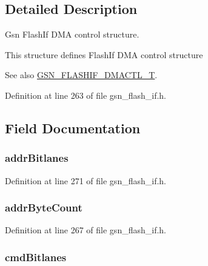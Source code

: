 \subsection{Detailed Description}
Gsn FlashIf DMA control structure. 

This structure defines FlashIf DMA control structure

\begin{DoxySeeAlso}{See also}
\hyperlink{a00647_ga3191e2eabef0c8e1b95922431d75565f}{GSN\_\-FLASHIF\_\-DMACTL\_\-T}. 
\end{DoxySeeAlso}


Definition at line 263 of file gsn\_\-flash\_\-if.h.



\subsection{Field Documentation}
\hypertarget{a00080_ac20b4d704a60073489c4a1369c753f88}{
\subsubsection[{addrBitlanes}]{ {\bf addrBitlanes}}}
\label{a00080_ac20b4d704a60073489c4a1369c753f88}


Definition at line 271 of file gsn\_\-flash\_\-if.h.

\hypertarget{a00080_a65a1735cd77a36302c9cadfa1b1a2f17}{
\subsubsection[{addrByteCount}]{ {\bf addrByteCount}}}
\label{a00080_a65a1735cd77a36302c9cadfa1b1a2f17}


Definition at line 267 of file gsn\_\-flash\_\-if.h.

\hypertarget{a00080_a56e303db1c31bae569294ce41ce90c60}{
\subsubsection[{cmdBitlanes}]{ {\bf cmdBitlanes}}}
\label{a00080_a56e303db1c31bae569294ce41ce90c60}


